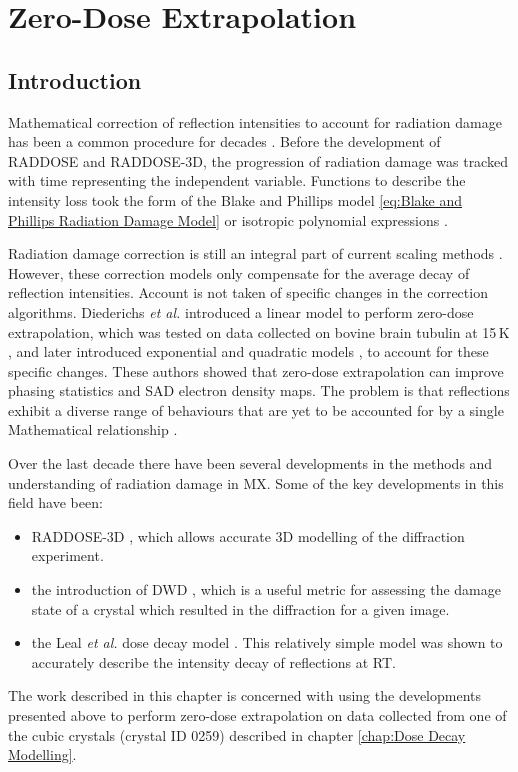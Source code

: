 \chapter{Zero-Dose Extrapolation}
\label{chap:Zero-Dose Extrapolation}

\section{Introduction}
\label{sec:Introduction - Zero-Dose extrapolation}
Mathematical correction of reflection intensities to account for radiation damage has been a common procedure for decades \cite{hendrickson1973,abrahams1987anisotropy}.
Before the development of RADDOSE and RADDOSE-3D, the progression of radiation damage was tracked with time representing the independent variable.
Functions to describe the intensity loss took the form of the Blake and Phillips model \ref{eq:Blake and Phillips Radiation Damage Model} or isotropic polynomial expressions \cite{abrahams1987anisotropy}.

Radiation damage correction is still an integral part of current scaling methods \cite{otwinowski2003multiparametric,evans2005,kabsch2010integration}.
However, these correction models only compensate for the average decay of reflection intensities.
Account is not taken of specific changes in the correction algorithms.
Diederichs \textit{et al.}  introduced a linear model to perform zero-dose extrapolation, which was tested on data collected on bovine brain tubulin at 15$\,$K \cite{diederichs2003}, and later introduced exponential and quadratic models \cite{diederichs2006}, to account for these specific changes.
These authors showed that zero-dose extrapolation can improve phasing statistics and SAD electron density maps.
The problem is that reflections exhibit a diverse range of behaviours that are yet to be accounted for by a single Mathematical relationship \cite{blake1962,abrahams1973}.

Over the last decade there have been several developments in the methods and understanding of radiation damage in MX.
Some of the key developments in this field have been:
\begin{itemize}
    \item RADDOSE-3D \cite{zeldin2013}, which allows accurate 3D modelling of the diffraction experiment.
    \item the introduction of DWD \cite{zeldin2013dwd}, which is a useful metric for assessing the damage state of a crystal which resulted in the diffraction for a given image.
    \item the Leal \textit{et al.} dose decay model \cite{leal2012}. This relatively simple model was shown to accurately describe the intensity decay of reflections at RT.
\end{itemize}
The work described in this chapter is concerned with using the developments presented above to perform zero-dose extrapolation on data collected from one of the cubic crystals (crystal ID 0259) described in chapter \ref{chap:Dose Decay Modelling}.
